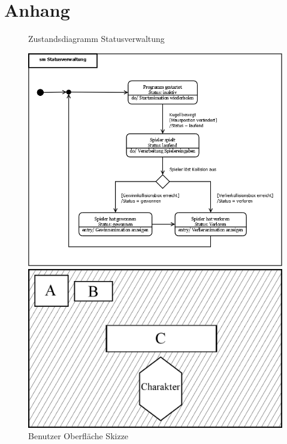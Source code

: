 \chapter{Anhang}

\begin{figure}[H]
\centering
\caption{Zustandsdiagramm Statusverwaltung}
\includegraphics[scale=0.35]{Bilder/Diagramme/smStatusverwaltung.png}

\caption{Benutzer Oberfläche Skizze}
\includegraphics[scale=0.285]{Bilder/Diagramme/UserInterface.png}
\end{figure}
\newpage{}